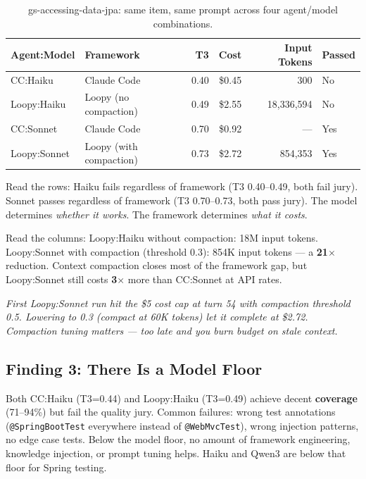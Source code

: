 \documentclass[11pt,a4paper]{article}
\begin{document}
\begin{table}[H]
\centering
\small
\begin{tabular}{@{}llrrrl@{}}
\toprule
\textbf{Agent:Model} & \textbf{Framework} & \textbf{T3} & \textbf{Cost} & \textbf{Input Tokens} & \textbf{Passed} \\
\midrule
CC:Haiku         & Claude Code & 0.40 & \$0.45  & 300         & No \\
Loopy:Haiku      & Loopy (no compaction) & 0.49 & \$2.55  & 18,336,594  & No \\
CC:Sonnet        & Claude Code & 0.70 & \$0.92  & ---         & Yes \\
Loopy:Sonnet     & Loopy (with compaction) & 0.73 & \$2.72  & 854,353     & Yes \\
\bottomrule
\end{tabular}
\caption{gs-accessing-data-jpa: same item, same prompt across four agent/model combinations.}
\end{table}

Read the rows: Haiku fails regardless of framework (T3 0.40--0.49, both fail jury).
Sonnet passes regardless of framework (T3 0.70--0.73, both pass jury).
The model determines \emph{whether it works}. The framework determines \emph{what it costs}.

Read the columns: Loopy:Haiku without compaction: 18M input tokens.
Loopy:Sonnet with compaction (threshold 0.3): 854K input tokens ---
a \textbf{21$\times$} reduction. Context compaction closes most of the framework gap,
but Loopy:Sonnet still costs \textbf{3$\times$} more than CC:Sonnet at API rates.

\textit{First Loopy:Sonnet run hit the \$5 cost cap at turn 54 with compaction
threshold 0.5. Lowering to 0.3 (compact at 60K tokens) let it complete at \$2.72.
Compaction tuning matters --- too late and you burn budget on stale context.}

\subsection{Finding 3: There Is a Model Floor}

Both CC:Haiku (T3=0.44) and Loopy:Haiku (T3=0.49) achieve decent
\textbf{coverage} (71--94\%) but fail the quality jury. Common failures:
wrong test annotations (\texttt{@SpringBootTest} everywhere instead of
\texttt{@WebMvcTest}), wrong injection patterns, no edge case tests.
Below the model floor, no amount of framework engineering, knowledge injection,
or prompt tuning helps. Haiku and Qwen3 are below that floor for Spring testing.
\end{document}
